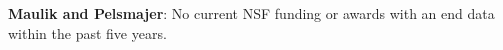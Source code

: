\documentclass[11pt]{NSFamsart}
\begin{document}
\medskip 
 
\noindent  \textbf{Maulik and Pelsmajer}: No current NSF funding or   awards with an end data within the past five years. 

 




\newpage
{}
\renewcommand{\thepage} {\arabic{page}}


% 
%

\end{document}
